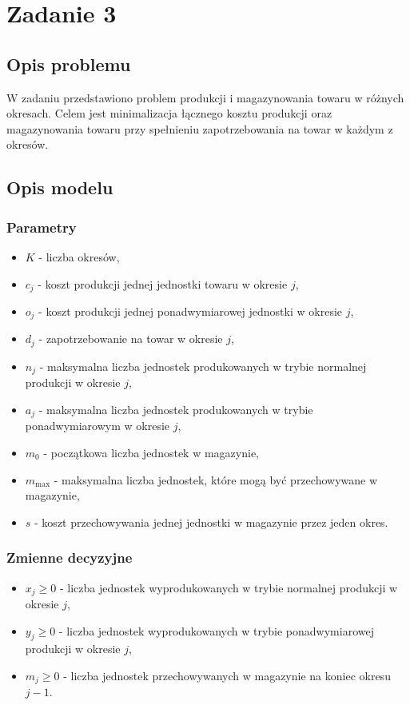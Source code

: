 \documentclass{article}
\begin{document}
\section{Zadanie 3}
\subsection{Opis problemu}
W zadaniu przedstawiono problem produkcji i magazynowania towaru w różnych okresach. Celem jest minimalizacja łącznego kosztu produkcji oraz magazynowania towaru przy spełnieniu zapotrzebowania na towar w każdym z okresów.

\subsection{Opis modelu}
\subsubsection{Parametry}
\begin{itemize}
    \item $K$ - liczba okresów,
    \item $c_j$ - koszt produkcji jednej jednostki towaru w okresie $j$,
    \item $o_j$ - koszt produkcji jednej ponadwymiarowej jednostki w okresie $j$,
    \item $d_j$ - zapotrzebowanie na towar w okresie $j$,
    \item $n_j$ - maksymalna liczba jednostek produkowanych w trybie normalnej produkcji w okresie $j$,
    \item $a_j$ - maksymalna liczba jednostek produkowanych w trybie ponadwymiarowym w okresie $j$,
    \item $m_0$ - początkowa liczba jednostek w magazynie,
    \item $m_{\text{max}}$ - maksymalna liczba jednostek, które mogą być przechowywane w magazynie,
    \item $s$ - koszt przechowywania jednej jednostki w magazynie przez jeden okres.
\end{itemize}

\subsubsection{Zmienne decyzyjne}
\begin{itemize}
    \item $x_j \geq 0$ - liczba jednostek wyprodukowanych w trybie normalnej produkcji w okresie $j$,
    \item $y_j \geq 0$ - liczba jednostek wyprodukowanych w trybie ponadwymiarowej produkcji w okresie $j$,
    \item $m_j \geq 0$ - liczba jednostek przechowywanych w magazynie na koniec okresu $j - 1$.
\end{itemize}
\end{document}
